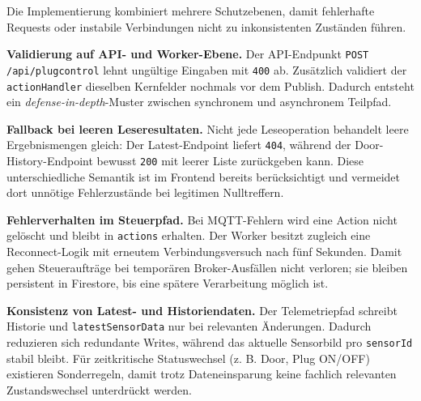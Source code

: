 Die Implementierung kombiniert mehrere Schutzebenen, damit fehlerhafte Requests oder instabile Verbindungen nicht zu inkonsistenten Zuständen führen.

\textbf{Validierung auf API- und Worker-Ebene.}
Der API-Endpunkt \texttt{POST /api/plugcontrol} lehnt ungültige Eingaben mit \texttt{400} ab. Zusätzlich validiert der \texttt{actionHandler} dieselben Kernfelder nochmals vor dem Publish. Dadurch entsteht ein \textit{defense-in-depth}-Muster zwischen synchronem und asynchronem Teilpfad.

\textbf{Fallback bei leeren Leseresultaten.}
Nicht jede Leseoperation behandelt leere Ergebnismengen gleich: Der Latest-Endpoint liefert \texttt{404}, während der Door-History-Endpoint bewusst \texttt{200} mit leerer Liste zurückgeben kann. Diese unterschiedliche Semantik ist im Frontend bereits berücksichtigt und vermeidet dort unnötige Fehlerzustände bei legitimen Nulltreffern.

\textbf{Fehlerverhalten im Steuerpfad.}
Bei MQTT-Fehlern wird eine Action nicht gelöscht und bleibt in \texttt{actions} erhalten. Der Worker besitzt zugleich eine Reconnect-Logik mit erneutem Verbindungsversuch nach fünf Sekunden. Damit gehen Steueraufträge bei temporären Broker-Ausfällen nicht verloren; sie bleiben persistent in Firestore, bis eine spätere Verarbeitung möglich ist.

\textbf{Konsistenz von Latest- und Historiendaten.}
Der Telemetriepfad schreibt Historie und \texttt{latestSensorData} nur bei relevanten Änderungen. Dadurch reduzieren sich redundante Writes, während das aktuelle Sensorbild pro \texttt{sensorId} stabil bleibt. Für zeitkritische Statuswechsel (z. B. Door, Plug ON/OFF) existieren Sonderregeln, damit trotz Dateneinsparung keine fachlich relevanten Zustandswechsel unterdrückt werden.







